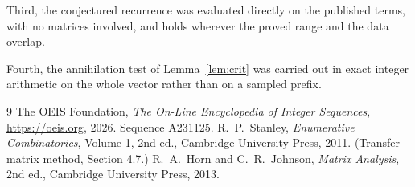 \documentclass[11pt,a4paper]{article}
\theoremstyle{plain}
\theoremstyle{definition}
\begin{document}
Third, the conjectured recurrence was evaluated directly on the published terms, with no
matrices involved, and holds wherever the proved range and the data overlap.

Fourth, the annihilation test of Lemma~\ref{lem:crit} was carried out in exact integer
arithmetic on the whole vector rather than on a sampled prefix.

\begin{thebibliography}{9}
 The OEIS Foundation, \emph{The On-Line Encyclopedia of Integer
Sequences}, \url{https://oeis.org}, 2026. Sequence A231125.
 R.~P.~Stanley, \emph{Enumerative Combinatorics}, Volume 1, 2nd ed.,
Cambridge University Press, 2011. (Transfer-matrix method, Section 4.7.)
 R.~A.~Horn and C.~R.~Johnson, \emph{Matrix Analysis}, 2nd ed., Cambridge
University Press, 2013.
\end{thebibliography}
\end{document}
